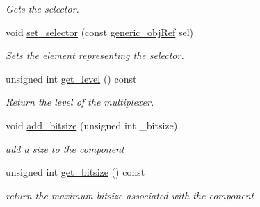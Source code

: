 \begin{DoxyCompactItemize}
\begin{DoxyCompactList}\small\item\em Gets the selector. \end{DoxyCompactList}\item 
void \hyperlink{classmux__obj_a54f02bc26c0bd5faf68aa83780e0d731}{set\+\_\+selector} (const \hyperlink{generic__obj_8hpp_acb533b2ef8e0fe72e09a04d20904ca81}{generic\+\_\+obj\+Ref} sel)
\begin{DoxyCompactList}\small\item\em Sets the element representing the selector. \end{DoxyCompactList}\item 
unsigned int \hyperlink{classmux__obj_a92447354f70d65d66c3552ff1240df0a}{get\+\_\+level} () const
\begin{DoxyCompactList}\small\item\em Return the level of the multiplexer. \end{DoxyCompactList}\item 
void \hyperlink{classmux__obj_a0cd258c5026332ced51880b39dfc0c9f}{add\+\_\+bitsize} (unsigned int \+\_\+bitsize)
\begin{DoxyCompactList}\small\item\em add a size to the component \end{DoxyCompactList}\item 
unsigned int \hyperlink{classmux__obj_a0d84e65629a8f217e8b9afa8c1af3254}{get\+\_\+bitsize} () const
\begin{DoxyCompactList}\small\item\em return the maximum bitsize associated with the component \end{DoxyCompactList}\end{DoxyCompactItemize}
